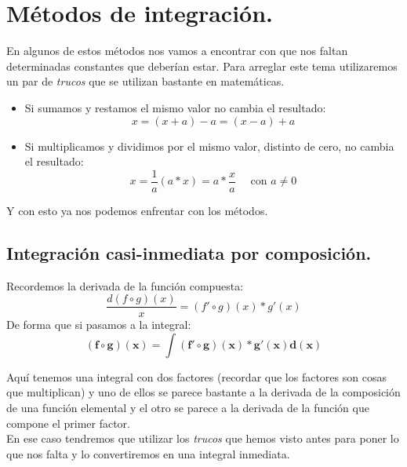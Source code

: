 \documentclass[a4paper,11pt,answers]{exam}
\begin{document}
\section{Métodos de integración.}
En algunos de estos métodos nos vamos a encontrar con que nos faltan determinadas constantes que deberían estar. Para arreglar este tema utilizaremos un par de \textit{trucos} que se utilizan bastante en matemáticas.
\begin{itemize}
	\item Si sumamos y restamos el mismo valor no cambia el resultado:
	\[x = (x + a) -a = (x-a) + a\]
	\item Si multiplicamos y dividimos por el mismo valor, distinto de cero, no cambia el resultado:
	\[x = \frac{1}{a}(a*x) = a *\frac{x}{a}\quad\text{ con } a\ne 0\]
\end{itemize}
Y con esto ya nos podemos enfrentar con los métodos.
\subsection{Integración casi-inmediata por composición.}
Recordemos la derivada de la función compuesta:
\[\frac{d(f \circ g)(x)}{x} = (f' \circ g)(x) * g'(x)\]
De forma que si pasamos a la integral:
\[\boldsymbol{(f \circ g)(x) = \int (f' \circ g)(x) * g'(x) d(x)}\]

Aquí tenemos una integral con dos factores (recordar que los factores son cosas que multiplican) y uno de ellos se parece bastante a la derivada de la composición de una función elemental y el otro se parece a la derivada de la función que compone el primer factor.\\
En ese caso tendremos que utilizar los \textit{trucos} que hemos visto antes para poner lo que nos falta y lo convertiremos en una integral inmediata.\\
\end{document}
